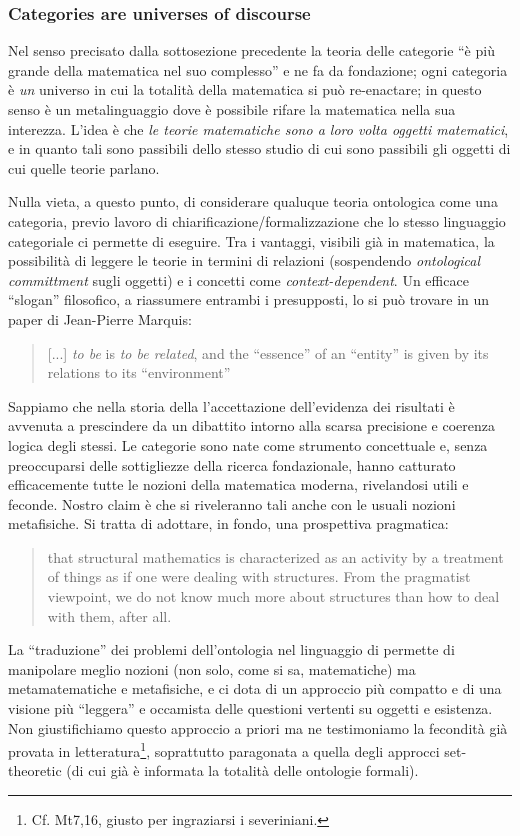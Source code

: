 \subsubsection{Categories are universes of discourse}
Nel senso precisato dalla sottosezione precedente la teoria delle categorie ``è più grande della matematica nel suo complesso'' e ne fa da fondazione; ogni categoria è \emph{un} universo in cui la totalità della matematica si può re-enactare; in questo senso è un metalinguaggio dove è possibile rifare la matematica nella sua interezza. L'idea è che \emph{le teorie matematiche sono a loro volta oggetti matematici}, e in quanto tali sono passibili dello stesso studio di cui sono passibili gli oggetti di cui quelle teorie parlano.

Nulla vieta, a questo punto, di considerare qualuque teoria ontologica come una categoria, previo lavoro di chiarificazione/formalizzazione che lo stesso linguaggio categoriale ci permette di eseguire. Tra i vantaggi, visibili già in matematica, la possibilità di leggere le teorie in termini di relazioni (sospendendo \emph{ontological committment} sugli oggetti) e i concetti come \emph{context-dependent}. Un efficace ``slogan'' filosofico, a riassumere entrambi i presupposti, lo si può trovare in un paper di Jean-Pierre Marquis:
\begin{quote}
	[...] \emph{to be} is \emph{to be related}, and the ``essence'' of an ``entity'' is given by its relations to its ``environment''
	\hfill \cite{Marquis1997}
\end{quote}
Sappiamo che nella storia della \CT l'accettazione dell'evidenza dei risultati è avvenuta a prescindere da un dibattito intorno alla scarsa precisione e coerenza logica degli stessi. Le categorie sono nate come strumento concettuale e, senza preoccuparsi delle sottigliezze della ricerca fondazionale, hanno catturato efficacemente tutte le nozioni della matematica moderna, rivelandosi utili e feconde. Nostro claim è che si riveleranno tali anche con le usuali nozioni metafisiche. Si tratta di adottare, in fondo, una prospettiva pragmatica:
\begin{quote}
	that structural mathematics is characterized as an activity by a treatment of things as if one were dealing with structures. From the pragmatist viewpoint, we do not know much more about structures than how to deal with them, after all. \hfill \cite{kromer2007tool}
\end{quote}
La ``traduzione'' dei problemi dell'ontologia nel linguaggio di \CT permette di manipolare meglio nozioni (non solo, come si sa, matematiche) ma metamatematiche e metafisiche, e ci dota di un approccio più compatto e di una visione più ``leggera'' e occamista delle questioni vertenti su oggetti e esistenza. Non giustifichiamo questo approccio a priori ma ne testimoniamo la fecondità già provata in letteratura\footnote{Cf. Mt7,16, giusto per ingraziarsi i severiniani.}, soprattutto paragonata a quella degli approcci set-theoretic (di cui già è informata la totalità delle ontologie formali).

